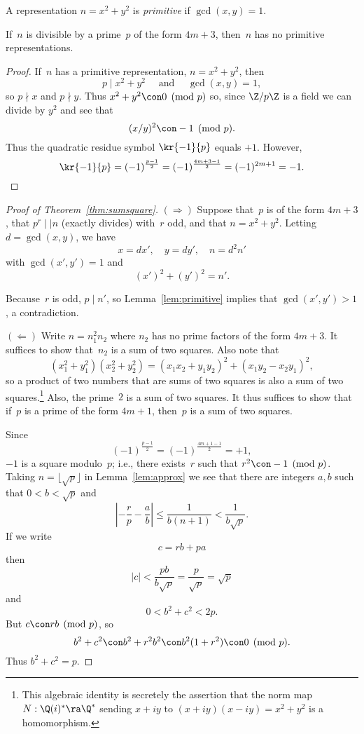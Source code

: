 \documentclass[11pt]{report}
\begin{document}
\begin{definition}
  A representation $n=x^2 + y^2$ is {\em primitive} if
  $\gcd(x,y)=1$.%
\end{definition}

\begin{lemma}\label{lem:primitive}
  If~$n$ is divisible by a prime~$p$ of the form $4m+3$, then~$n$
  has no primitive representations.
\end{lemma}
\begin{proof}
  If~$n$ has a primitive representation, $n=x^2 + y^2$, then
  $$
    p \mid x^2 + y^2\quad \text{ and }\quad \gcd(x,y)=1,
  $$
  so $p\nmid x$ and $p\nmid y$.  Thus
  $x^2 + y^2 \con 0\pmod{p}$
  so, since $\Z/p\Z$ is a field we can divide by $y^2$ and see that
  $$
    (x/y)^2 \con -1\pmod{p}.
  $$
  Thus the quadratic residue symbol $\kr{-1}{p}$ equals $+1$.
  However,
  $$
    \kr{-1}{p} = (-1)^{\frac{p-1}{2}} = (-1)^\frac{4m+3-1}{2} = (-1)^{2m+1} = -1.
  $$
\end{proof}

\begin{proof}[Proof of Theorem~\ref{thm:sumsquare}]
  \noindent$\left(\Longrightarrow\right)$
  Suppose that~$p$ is of the form $4m+3$, that $p^r\mid\mid n$ (exactly
  divides) with~$r$ odd, and that $n=x^2+y^2$.  Letting $d=\gcd(x,y)$,
  we have
  $$
    x = dx', \quad y = dy', \quad n = d^2 n'
  $$
  with $\gcd(x',y')=1$ and
  $$
    (x')^2 + (y')^2 = n'.
  $$

  Because~$r$ is odd, $p\mid n'$, so Lemma~\ref{lem:primitive}
  implies that $\gcd(x',y')>1$, a contradiction.
  \vspace{0.3ex}

  \noindent$\left(\Longleftarrow\right)$
  Write $n=n_1^2 n_2$ where $n_2$ has no prime factors of the
  form $4m+3$.  It suffices to show that~$n_2$ is a sum of two
  squares.  Also note that
  $$
    (x_1^2 + y_1^2)(x_2^2+y_2^2) = (x_1x_2+y_1y_2)^2 + (x_1y_2-x_2y_1)^2,
  $$
  so a product of two numbers that are sums of two squares is also
  a sum of two squares.\footnote{This algebraic identity is secretely
    the assertion that the norm map $N:\Q(i)^* \ra \Q^*$ sending
    $x+iy$ to $(x+iy)(x-iy)=x^2+y^2$ is a homomorphism.}
  Also, the prime~$2$ is a sum of two squares.
  It thus suffices to show that if~$p$ is a prime of the form
  $4m+1$, then~$p$ is a sum of two squares.

  Since
  $$
    (-1)^{\frac{p-1}{2}} = (-1)^{\frac{4m+1-1}{2}} = +1,
  $$
  $-1$ is a square modulo~$p$; i.e., there exists~$r$ such
  that $r^2\con -1\pmod{p}$.  Taking $n=\lfloor \sqrt{p}\rfloor$
  in Lemma~\ref{lem:approx} we see that there are integers $a, b$
  such that
  $0<b<\sqrt{p}$ and
  $$
    \left| -\frac{r}{p} - \frac{a}{b}\right| \leq\frac{1}{b(n+1)} < \frac{1}{b\sqrt{p}}.
  $$
  If we write
  $$
    c = rb + pa
  $$
  then
  $$
    |c| < \frac{pb}{b\sqrt{p}} = \frac{p}{\sqrt{p}} = \sqrt{p}
  $$
  and
  $$
    0 < b^2 + c^2 < 2p.
  $$
  But $c \con rb\pmod{p}$, so
  $$
    b^2 + c^2 \con b^2 + r^2 b^2 \con b^2(1+r^2) \con 0\pmod{p}.
  $$
  Thus $b^2 + c^2 = p$.
\end{proof}
\end{document}

